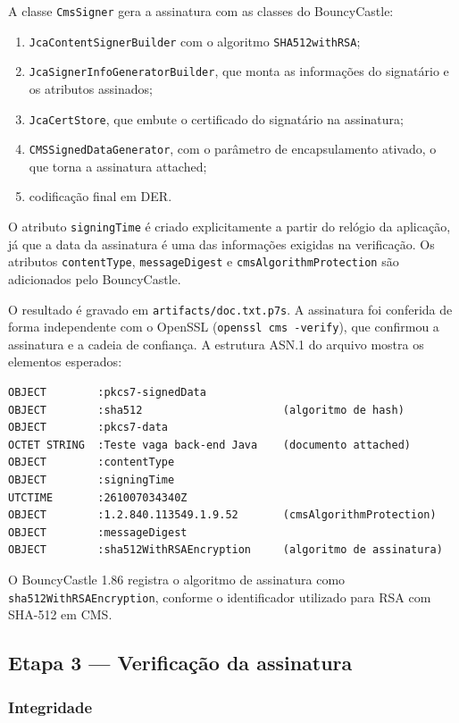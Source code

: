 \documentclass[12pt,a4paper]{article}
\begin{document}
A classe \texttt{CmsSigner} gera a assinatura com as classes do BouncyCastle:

\begin{enumerate}
    \item \texttt{JcaContentSignerBuilder} com o algoritmo \texttt{SHA512withRSA};
    \item \texttt{JcaSignerInfoGeneratorBuilder}, que monta as informações do signatário e os atributos assinados;
    \item \texttt{JcaCertStore}, que embute o certificado do signatário na assinatura;
    \item \texttt{CMSSignedDataGenerator}, com o parâmetro de encapsulamento ativado, o que torna a assinatura attached;
    \item codificação final em DER.
\end{enumerate}

O atributo \texttt{signingTime} é criado explicitamente a partir do relógio da aplicação, já que a data da assinatura é uma das informações exigidas na verificação. Os atributos \texttt{contentType}, \texttt{messageDigest} e \texttt{cmsAlgorithmProtection} são adicionados pelo BouncyCastle.

O resultado é gravado em \texttt{artifacts/doc.txt.p7s}. A assinatura foi conferida de forma independente com o OpenSSL (\texttt{openssl cms -verify}), que confirmou a assinatura e a cadeia de confiança. A estrutura ASN.1 do arquivo mostra os elementos esperados:

\begin{lstlisting}
OBJECT        :pkcs7-signedData
OBJECT        :sha512                      (algoritmo de hash)
OBJECT        :pkcs7-data
OCTET STRING  :Teste vaga back-end Java    (documento attached)
OBJECT        :contentType
OBJECT        :signingTime
UTCTIME       :261007034340Z
OBJECT        :1.2.840.113549.1.9.52       (cmsAlgorithmProtection)
OBJECT        :messageDigest
OBJECT        :sha512WithRSAEncryption     (algoritmo de assinatura)
\end{lstlisting}

O BouncyCastle 1.86 registra o algoritmo de assinatura como \texttt{sha512WithRSAEncryption}, conforme o identificador utilizado para RSA com SHA-512 em CMS.

\subsection{Etapa 3 --- Verificação da assinatura}

\subsubsection{Integridade}
\end{document}

